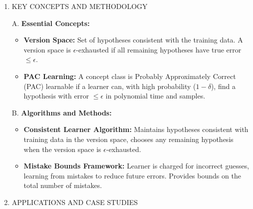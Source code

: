 \documentclass[
  12pt,
]{report}
\providecommand{\tightlist}{%
  \setlength{\itemsep}{0pt}\setlength{\parskip}{0pt}}
\begin{document}
\begin{enumerate}
\begin{itemize}
    \begin{itemize}
    \tightlist
    \item
      \textbf{Sample Complexity Bound:} Derived using the inequality \(-\epsilon \geq \log(1-\epsilon)\), leading to \(|H| \cdot e^{-\epsilon M} \leq \delta\). Rearranging gives \(M \geq \frac{1}{\epsilon}(\log|H| + \log\frac{1}{\delta})\).
    \end{itemize}
  \item
    \textbf{Theoretical Constraints and Assumptions:}

    \begin{itemize}
    \tightlist
    \item
      Assumes the hypothesis space is finite for deriving sample complexity bounds. The results may not directly apply to infinite hypothesis spaces, which require additional theoretical tools.
    \end{itemize}
  \end{itemize}
\item
  KEY CONCEPTS AND METHODOLOGY

  A. \textbf{Essential Concepts:}

  \begin{itemize}
  \tightlist
  \item
    \textbf{Version Space:} Set of hypotheses consistent with the training data. A version space is \(\epsilon\)-exhausted if all remaining hypotheses have true error \(\leq \epsilon\).
  \item
    \textbf{PAC Learning:} A concept class is Probably Approximately Correct (PAC) learnable if a learner can, with high probability (\(1-\delta\)), find a hypothesis with error \(\leq \epsilon\) in polynomial time and samples.
  \end{itemize}

  B. \textbf{Algorithms and Methods:}

  \begin{itemize}
  \tightlist
  \item
    \textbf{Consistent Learner Algorithm:} Maintains hypotheses consistent with training data in the version space, chooses any remaining hypothesis when the version space is \(\epsilon\)-exhausted.
  \item
    \textbf{Mistake Bounds Framework:} Learner is charged for incorrect guesses, learning from mistakes to reduce future errors. Provides bounds on the total number of mistakes.
  \end{itemize}
\item
  APPLICATIONS AND CASE STUDIES


\end{enumerate}
\end{document}

